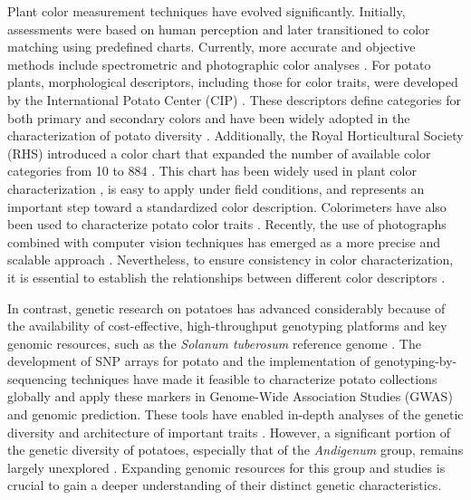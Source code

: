 \documentclass[pdflatex,sn-mathphys-ay]{sn-jnl}%
\begin{document}
Plant color measurement techniques have evolved significantly. Initially, assessments were based on human perception and later transitioned to color matching using predefined charts. Currently, more accurate and objective methods include spectrometric and photographic color analyses \citep{kasajima2019measuring}. For potato plants, morphological descriptors, including those for color traits, were developed by the International Potato Center (CIP) \citep{huaman1977descriptors,gomez2000guia}. These descriptors define categories for both primary and secondary colors and have been widely adopted in the characterization of potato diversity \citep{behn2023phenolic, Berdugo2017, larico2024descripcion}. Additionally, the Royal Horticultural Society (RHS) introduced a color chart that expanded the number of available color categories from 10 to 884 \citep{RHS2015}. This chart has been widely used in plant color characterization \citep{tang2014effects}, is easy to apply under field conditions, and represents an important step toward a standardized color description. Colorimeters have also been used to characterize potato color traits \citep{thornton2013influence}. Recently, the use of photographs combined with computer vision techniques has emerged as a more precise and scalable approach \citep{miller2023tubar,yusuf2024genomic,azizi2016identifying,ropelewska2021effect,feldman2024}. Nevertheless, to ensure consistency in color characterization, it is essential to establish the relationships between different color descriptors \citep{voss1992relating,ayala2006evaluation}. 

In contrast, genetic research on potatoes has advanced considerably because of the availability of cost-effective, high-throughput genotyping platforms and key genomic resources, such as the \textit{Solanum tuberosum} reference genome \citep{xu2011genome,Pham2020}. The development of SNP arrays for potato \citep{felcher2012integration, vos2015development} and the implementation of genotyping-by-sequencing techniques \citep{sharma2024genotyping} have made it feasible to characterize potato collections globally and apply these markers in Genome-Wide Association Studies (GWAS) and genomic prediction. These tools have enabled in-depth analyses of the genetic diversity and architecture of important traits \citep{sharma2024genotyping, pandey2021genetic}. However, a significant portion of the genetic diversity of potatoes, especially that of the \textit{Andigenum} group, remains largely unexplored \citep{ghislain2020genes}. Expanding genomic resources for this group and studies is crucial to gain a deeper understanding of their distinct genetic characteristics.
\end{document}
